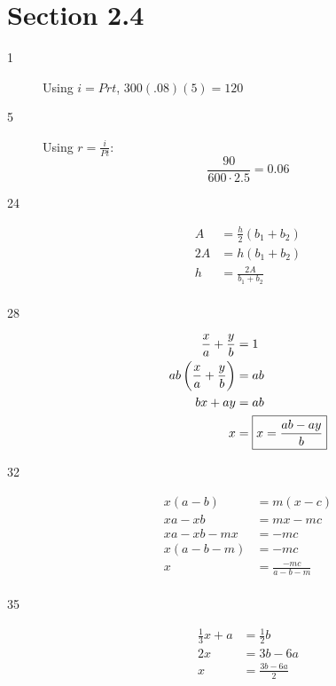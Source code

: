 \documentclass[letterpaper, landscape]{exam}
\begin{document}
    \section{Section 2.4} %
    \begin{description}
      
      \item[1] Using $i = Prt$, $300(.08)(5) = \boxed{ 120 }$

      \item[5] Using $r = \frac{i}{Pt}$:
        \[
          \frac{90}{600 \cdot 2.5} = \boxed{ 0.06 } 
        \]

      \item[24]
        \begin{align*}
          A  & = \frac{h}{2} (b_1 + b_2) \\
          2A & = h(b_1 + b_2) \\
          h  & = \frac{2A}{b_1 + b_2} \\
        \end{align*}

      \item[28]
      \begin{align*}
        \frac{x}{a} + \frac{y}{b}            & = 1 \\
        ab \del{ \frac{x}{a} + \frac{y}{b} } & = ab  \\
        bx + ay                              & =ab \\
        x                                    & = \boxed{ x = \frac{ab - ay}{b} } \\
      \end{align*}

      \item[32]
        \begin{align*}
          x(a-b)   & = m(x-c) \\
          xa-xb    & = mx-mc \\
          xa-xb-mx & = -mc \\
          x(a-b-m) & = -mc \\
          x        & = \boxed{ \frac{-mc}{a - b - m} } \\
        \end{align*}

      \item[35]
      \begin{align*}
        \frac{1}{3}x + a & = \frac{1}{2}b \\
        2x               & = 3b - 6a \\
        x                & = \boxed{ \frac{3b - 6a}{2} } \\
      \end{align*}


\end{description}
\end{document}
